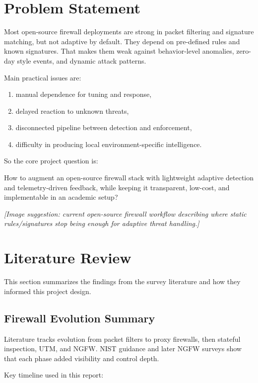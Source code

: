 \documentclass[12pt,a4paper]{article}
\begin{document}
\section{Problem Statement}

Most open-source firewall deployments are strong in packet filtering and signature matching, but not adaptive by default. They depend on pre-defined rules and known signatures. That makes them weak against behavior-level anomalies, zero-day style events, and dynamic attack patterns.

Main practical issues are:

\begin{enumerate}
    \item manual dependence for tuning and response,
    \item delayed reaction to unknown threats,
    \item disconnected pipeline between detection and enforcement,
    \item difficulty in producing local environment-specific intelligence.
\end{enumerate}

So the core project question is:

How to augment an open-source firewall stack with lightweight adaptive detection and telemetry-driven feedback, while keeping it transparent, low-cost, and implementable in an academic setup?

\textit{[Image suggestion: current open-source firewall workflow describing where static rules/signatures stop being enough for adaptive threat handling.]}

\section{Literature Review}

This section summarizes the findings from the survey literature and how they informed this project design.

\subsection{Firewall Evolution Summary}

Literature tracks evolution from packet filters to proxy firewalls, then stateful inspection, UTM, and NGFW. NIST guidance and later NGFW surveys show that each phase added visibility and control depth.

Key timeline used in this report:
\end{document}
